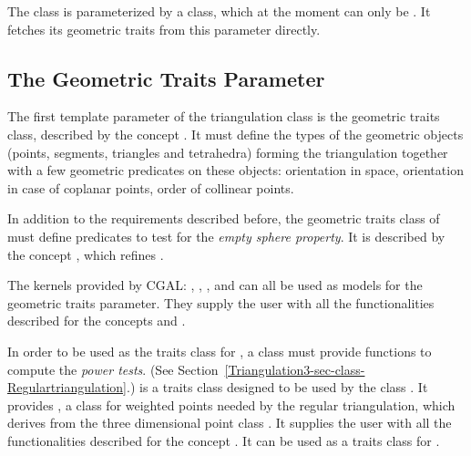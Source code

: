 The class  is parameterized by a class, which at
the moment can only be .  It fetches its
geometric traits from this parameter directly.

\subsection{The Geometric Traits Parameter}
\label{Triangulation3-sec-Traits}

The first template parameter of the triangulation class
is the geometric traits class, described by the concept
.  It must define the types of the geometric objects
(points, segments, triangles and tetrahedra) forming the triangulation together
with a few geometric predicates on these objects: orientation in space,
orientation in case of coplanar points, order of collinear points.

In addition to the requirements described before, the geometric traits
class of  must define predicates to test for the
\textit{empty sphere property}.  It is described by the concept
, which refines .

The kernels provided by CGAL: , ,
,  and
 can all be used as models for the geometric traits
parameter.
They supply the user with all the functionalities described for the concepts
 and
.

In order to be used as the traits class for ,
a class must provide functions to compute the \textit{power tests}.
(See Section~\ref{Triangulation3-sec-class-Regulartriangulation}.)
 is a traits class 
 designed to be used by the class
. It provides
, a class for weighted points
needed by the regular triangulation, which derives from the three dimensional
point class .
It supplies the user with all the functionalities 
described for the concept . 
It can be used as a traits class for
.

